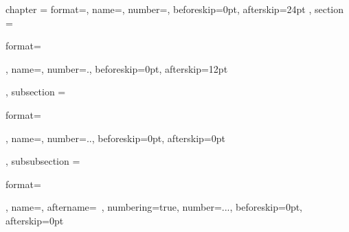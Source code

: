 \ctexset
{
    chapter =
        {
            format=\centering{}\heiti,
            name={},
            number=,
            beforeskip=0pt,
            afterskip=24pt
        },
    section =
        {
            format=\raggedright\heiti{},
            name={},
            number=.,
            beforeskip=0pt,
            afterskip=12pt
        },
    subsection =
        {
            format=\raggedright\heiti{},
            name={},
            number=..,
            beforeskip=0pt,
            afterskip=0pt
        },
    subsubsection =
        {
            format=\raggedright\heiti{},
            name={},
            aftername=~,
            numbering=true,
            number=...,
            beforeskip=0pt,
            afterskip=0pt
        }
}
